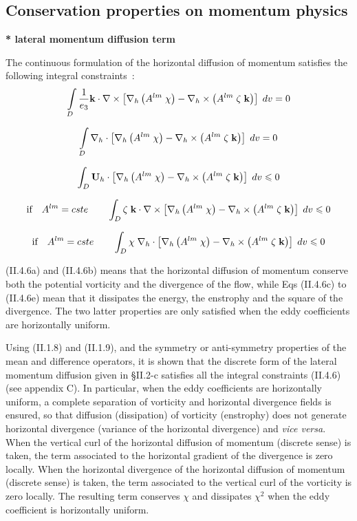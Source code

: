\documentclass[../main/NEMO_manual]{subfiles}
\begin{document}
\subsection{Conservation properties on momentum physics}
\label{subsec:Invariant_dyn_physics}

\textbf{* lateral momentum diffusion term}

The continuous formulation of the horizontal diffusion of momentum satisfies the following integral constraints~:
\[
  \int\limits_D {\frac{1}{e_3 }{\rm {\bf k}}\cdot \nabla \times \left[ {\nabla
        _h \left( {A^{lm}\;\chi } \right)-\nabla _h \times \left( {A^{lm}\;\zeta
            \;{\rm {\bf k}}} \right)} \right]\;dv} =0
\]

\[
  \int\limits_D {\nabla _h \cdot \left[ {\nabla _h \left( {A^{lm}\;\chi }
        \right)-\nabla _h \times \left( {A^{lm}\;\zeta \;{\rm {\bf k}}} \right)}
    \right]\;dv} =0
\]

\[
  \int_D {{\rm {\bf U}}_h \cdot \left[ {\nabla _h \left( {A^{lm}\;\chi }
        \right)-\nabla _h \times \left( {A^{lm}\;\zeta \;{\rm {\bf k}}} \right)}
    \right]\;dv} \leqslant 0
\]

\[
  \mbox{if}\quad A^{lm}=cste\quad \quad \int_D {\zeta \;{\rm {\bf k}}\cdot
    \nabla \times \left[ {\nabla _h \left( {A^{lm}\;\chi } \right)-\nabla _h
        \times \left( {A^{lm}\;\zeta \;{\rm {\bf k}}} \right)} \right]\;dv}
  \leqslant 0
\]

\[
  \mbox{if}\quad A^{lm}=cste\quad \quad \int_D {\chi \;\nabla _h \cdot \left[
      {\nabla _h \left( {A^{lm}\;\chi } \right)-\nabla _h \times \left(
          {A^{lm}\;\zeta \;{\rm {\bf k}}} \right)} \right]\;dv} \leqslant 0
\]


(II.4.6a) and (II.4.6b) means that the horizontal diffusion of momentum conserve both the potential vorticity and
the divergence of the flow, while Eqs (II.4.6c) to (II.4.6e) mean that it dissipates the energy, the enstrophy and
the square of the divergence.
The two latter properties are only satisfied when the eddy coefficients are horizontally uniform.

Using (II.1.8) and (II.1.9), and the symmetry or anti-symmetry properties of the mean and difference operators,
it is shown that the discrete form of the lateral momentum diffusion given in
{\S}II.2-c satisfies all the integral constraints (II.4.6) (see appendix C).
In particular, when the eddy coefficients are horizontally uniform,
a complete separation of vorticity and horizontal divergence fields is ensured,
so that diffusion (dissipation) of vorticity (enstrophy) does not generate horizontal divergence
(variance of the horizontal divergence) and \textit{vice versa}.
When the vertical curl of the horizontal diffusion of momentum (discrete sense) is taken,
the term associated to the horizontal gradient of the divergence is zero locally.
When the horizontal divergence of the horizontal diffusion of momentum (discrete sense) is taken,
the term associated to the vertical curl of the vorticity is zero locally.
The resulting term conserves $\chi$ and dissipates $\chi^2$ when the eddy coefficient is horizontally uniform.
\end{document}
